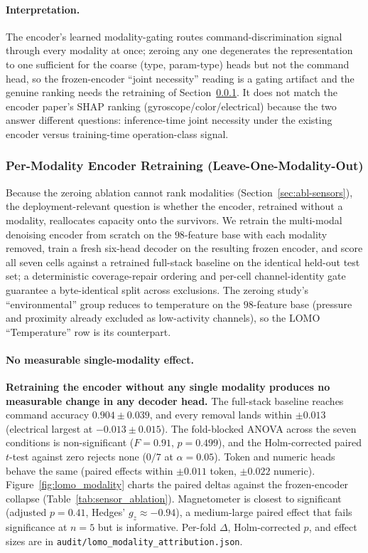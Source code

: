\documentclass[sensors,article,submit,moreauthors,pdftex]{Definitions/mdpi}
\begin{document}



\paragraph{Interpretation.} The encoder's learned modality-gating routes command-discrimination signal through every modality at once; zeroing any one degenerates the representation to one sufficient for the coarse (type, param-type) heads but not the command head, so the frozen-encoder ``joint necessity'' reading is a gating artifact and the genuine ranking needs the retraining of Section~\ref{sec:abl-lomo}. It does not match the encoder paper's SHAP ranking (gyroscope/color/electrical) because the two answer different questions: inference-time joint necessity under the existing encoder versus training-time operation-class signal.

\subsubsection{Per-Modality Encoder Retraining (Leave-One-Modality-Out)}
\label{sec:abl-lomo}

Because the zeroing ablation cannot rank modalities (Section~\ref{sec:abl-sensors}), the deployment-relevant question is whether the encoder, retrained without a modality, reallocates capacity onto the survivors. We retrain the multi-modal denoising encoder from scratch on the $98$-feature base with each modality removed, train a fresh six-head decoder on the resulting frozen encoder, and score all seven cells against a retrained full-stack baseline on the identical held-out test set; a deterministic coverage-repair ordering and per-cell channel-identity gate guarantee a byte-identical split across exclusions. The zeroing study's ``environmental'' group reduces to temperature on the $98$-feature base (pressure and proximity already excluded as low-activity channels), so the LOMO ``Temperature'' row is its counterpart.

\paragraph{No measurable single-modality effect.} \textbf{Retraining the encoder without any single modality produces no measurable change in any decoder head.} The full-stack baseline reaches command accuracy $0.904 \pm 0.039$, and every removal lands within $\pm 0.013$ (electrical largest at $-0.013 \pm 0.015$). The fold-blocked ANOVA across the seven conditions is non-significant ($F=0.91$, $p=0.499$), and the Holm-corrected paired $t$-test against zero rejects none ($0/7$ at $\alpha=0.05$). Token and numeric heads behave the same (paired effects within $\pm 0.011$ token, $\pm 0.022$ numeric). Figure~\ref{fig:lomo_modality} charts the paired deltas against the frozen-encoder collapse (Table~\ref{tab:sensor_ablation}). Magnetometer is closest to significant (adjusted $p=0.41$, Hedges' $g_z \approx -0.94$), a medium-large paired effect that fails significance at $n\!=\!5$ but is informative. Per-fold $\Delta$, Holm-corrected $p$, and effect sizes are in \texttt{audit/lomo\_modality\_attribution.json}.
\end{document}

